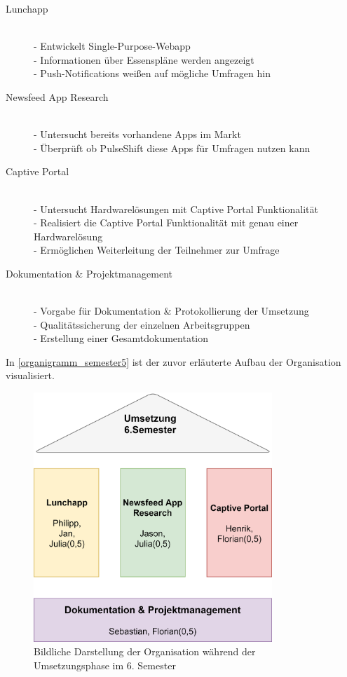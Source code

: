 \begin{description}
\item[Lunchapp]\hfill \\
- Entwickelt Single-Purpose-Webapp\\
- Informationen über Essenspläne werden angezeigt\\
- Push-Notifications weißen auf mögliche Umfragen hin


\item[Newsfeed App Research]\hfill \\
- Untersucht bereits vorhandene Apps im Markt\\
- Überprüft ob PulseShift diese Apps für Umfragen nutzen kann

\item[Captive Portal]\hfill \\
- Untersucht Hardwarelösungen mit Captive Portal Funktionalität\\
- Realisiert die Captive Portal Funktionalität mit genau einer Hardwarelösung\\
- Ermöglichen Weiterleitung der Teilnehmer zur Umfrage

\item[Dokumentation \& Projektmanagement]\hfill \\
- Vorgabe für Dokumentation \& Protokollierung der Umsetzung\\
- Qualitätssicherung der einzelnen Arbeitsgruppen\\
- Erstellung einer Gesamtdokumentation
\end{description}

In \vref{organigramm_semester5} ist der zuvor erläuterte Aufbau der Organisation visualisiert.

\begin{figure}[h]
\centering
\includegraphics[width=9cm]{images/organigramm_semester6}
\caption{Bildliche Darstellung der Organisation während der Umsetzungsphase im 6. Semester\protect}
\label{organigramm_semester6}
\end{figure}